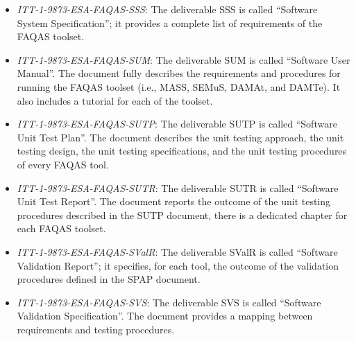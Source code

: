 \begin{itemize}
	\item \emph{ITT-1-9873-ESA-FAQAS-SSS}: The deliverable SSS is called ``Software System Specification''; it provides a complete list of requirements of the FAQAS toolset.

	\item \emph{ITT-1-9873-ESA-FAQAS-SUM}: The deliverable SUM is called ``Software User Manual''. The document fully describes the requirements and procedures for running the FAQAS toolset (i.e., MASS, SEMuS, DAMAt, and DAMTe). It also includes a tutorial for each of the toolset.

	\item \emph{ITT-1-9873-ESA-FAQAS-SUTP}: The deliverable SUTP is called ``Software Unit Test Plan''. The document describes the unit testing approach, the unit testing design, the unit testing specifications, and the unit testing procedures of every FAQAS tool.

	\item \emph{ITT-1-9873-ESA-FAQAS-SUTR}: The deliverable SUTR is called ``Software Unit Test Report''. The document reports the outcome of the unit testing procedures described in the SUTP document, there is a dedicated chapter for each FAQAS toolset.

	\item \emph{ITT-1-9873-ESA-FAQAS-SValR}: The deliverable SValR is called ``Software Validation Report''; it specifies, for each tool, the outcome of the validation procedures defined in the SPAP document.

	\item \emph{ITT-1-9873-ESA-FAQAS-SVS}: The deliverable SVS is called ``Software Validation Specification''. The document provides a mapping between requirements and testing procedures.
\end{itemize}
